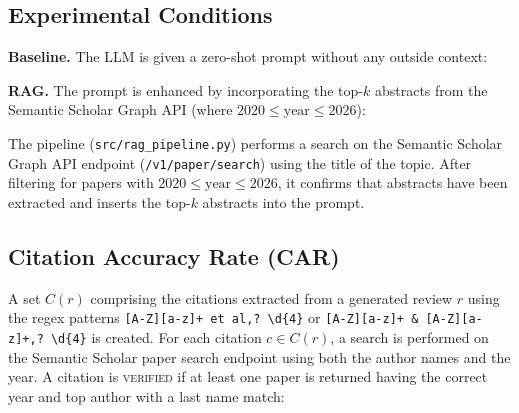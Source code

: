 \documentclass[conference]{IEEEtran}
\begin{document}
\subsection{Experimental Conditions}

\textbf{Baseline.} The LLM is given a zero-shot prompt without any outside context:
\begin{center}
\end{center}

\textbf{RAG.} The prompt is enhanced by incorporating the top-$k$ abstracts from
the Semantic Scholar Graph API (where $2020 \le \text{year} \le 2026$):

\begin{center}
\end{center}

The pipeline (\texttt{src/rag\_pipeline.py}) performs a search on the Semantic
Scholar Graph API endpoint (\texttt{/v1/paper/search}) using the title of the topic. After filtering for papers with $2020 \le
\text{year} \le 2026$, it confirms that abstracts have been extracted and inserts the top-$k$ abstracts into the prompt.

\subsection{Citation Accuracy Rate (CAR)}
\label{sec:car}

A set $C(r)$ comprising the citations extracted from a generated review $r$ using
the regex patterns \texttt{[A-Z][a-z]+ et al\.,?\ \textbackslash d\{4\}} or
\texttt{[A-Z][a-z]+ \& [A-Z][a-z]+,?\ \textbackslash d\{4\}} is created. For each citation $c \in C(r)$, a
search is performed on the Semantic Scholar paper search endpoint using both
the author names and the year. A citation is \textsc{verified} if at least one paper is returned having the correct year and top author with a last name match:
\end{document}
